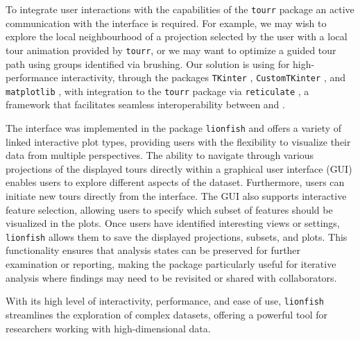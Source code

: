 \documentclass[article]{ajs}
\begin{document}
To integrate user interactions with the capabilities of the \texttt{tourr} package an active communication with the interface is required. For example, we may wish to explore the local neighbourhood of a projection selected by the user with a local tour animation provided by \texttt{tourr}, or we may want to optimize a guided tour path using groups identified via brushing.
Our solution is using  for high-performance interactivity, through the packages \texttt{TKinter} \citep{lundh1999introduction}, \texttt{CustomTKinter} \citep{schimansky24}, and \texttt{matplotlib} \citep{Hunter:2007}, with integration to the \texttt{tourr} package \citep{tourr} via \texttt{reticulate} \citep{reticulate}, a framework that facilitates seamless interoperability between  and .


The interface was implemented in the  package \texttt{lionfish} and offers a variety of linked interactive plot types, providing users with the flexibility to visualize their data from multiple perspectives. The ability to navigate through various projections of the displayed tours directly within a graphical user interface (GUI) enables users to explore different aspects of the dataset. Furthermore, users can initiate new tours directly from the interface. The GUI also supports interactive feature selection, allowing users to specify which subset of features should be visualized in the plots. Once users have identified interesting views or settings, \texttt{lionfish} allows them to save the displayed projections, subsets, and plots. This functionality ensures that analysis states can be preserved for further examination or reporting, making the package particularly useful for iterative analysis where findings may need to be revisited or shared with collaborators.

With its high level of interactivity, performance, and ease of use, \texttt{lionfish} streamlines the exploration of complex datasets, offering a powerful tool for researchers working with high-dimensional data.
\end{document}
